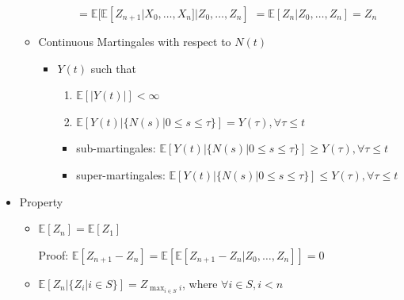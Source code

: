 \documentclass[a4paper]{article}
\begin{document}
\begin{itemize}
\begin{itemize}
\begin{itemize}
\begin{itemize}
                                $= \mathbb{E}[\mathbb{E}[Z_{n+1}| X_0, \dots, X_n]| Z_0, \dots, Z_n]$
                                $= \mathbb{E}[Z_n| Z_0, \dots, Z_n] = Z_n$
                        \end{itemize}
                \end{itemize}
            \item Continuous Martingales with respect to $N(t)$
                \begin{itemize}
                    \item $Y(t)$ such that
                        \begin{enumerate}
                            \item $\mathbb{E}[|Y(t)|] < \infty$
                            \item $\mathbb{E}[Y(t)| \{N(s) | 0 \leq s \leq \tau\}] = Y(\tau), \forall \tau \leq t$
                        \end{enumerate}
                        \begin{itemize}
                            \item sub-martingales: $\mathbb{E}[Y(t)| \{N(s) | 0 \leq s \leq \tau\}] \geq Y(\tau), \forall \tau \leq t$
                            \item super-martingales: $\mathbb{E}[Y(t)| \{N(s) | 0 \leq s \leq \tau\}] \leq Y(\tau), \forall \tau \leq t$
                        \end{itemize}
                \end{itemize}
        \end{itemize}
    \item Property
        \begin{itemize}
            \item $\mathbb{E}[Z_n] = \mathbb{E}[Z_1]$

                Proof: $\mathbb{E}[Z_{n+1} - Z_n] = \mathbb{E}[\mathbb{E}[Z_{n+1} - Z_n| Z_0, \dots, Z_n]] = 0$
            \item $\mathbb{E}[Z_n | \{Z_i | i \in S\}] = Z_{\max_{i \in S} i}$, where $\forall i \in S, i < n$


\end{itemize}
\end{itemize}
\end{document}
